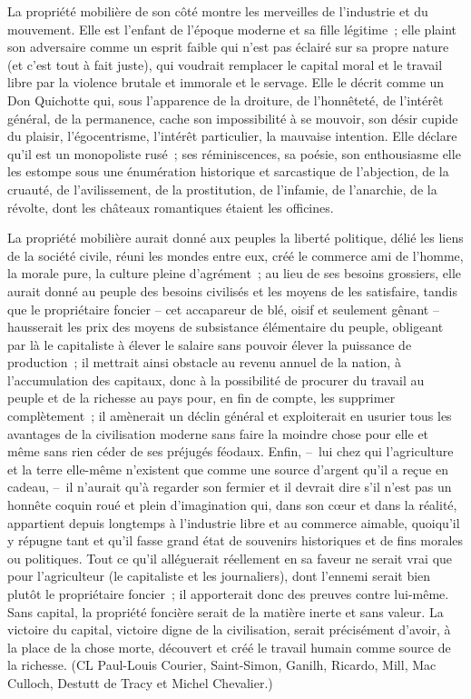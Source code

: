 \documentclass[french,twoside]{book} %
\begin{document}
La propriété mobilière de son côté montre les merveilles de l’industrie et du mouvement. Elle est l’enfant de l’époque moderne et sa fille légitime ; elle plaint son adversaire comme un esprit faible qui n’est pas éclairé sur sa propre nature (et c’est tout à fait juste), qui voudrait remplacer le capital moral et le travail libre par la violence brutale et immorale et le servage. Elle le décrit comme un Don Quichotte qui, sous l’apparence de la droiture, de l’honnêteté, de l’intérêt général, de la permanence, cache son impossibilité à se mouvoir, son désir cupide du plaisir, l’égocentrisme, l’intérêt particulier, la mauvaise intention. Elle déclare qu’il est un monopoliste rusé ; ses réminiscences, sa poésie, son enthousiasme elle les estompe sous une énumération historique et sarcastique de l’abjection, de la cruauté, de l’avilissement, de la prostitution, de l’infamie, de l’anarchie, de la révolte, dont les châteaux romantiques étaient les officines.\par
[XLIII] La propriété mobilière aurait donné aux peuples la liberté politique, délié les liens de la société civile, réuni les mondes entre eux, créé le commerce ami de l’homme, la morale pure, la culture pleine d’agrément ; au lieu de ses besoins grossiers, elle aurait donné au peuple des besoins civilisés et les moyens de les satisfaire, tandis que le propriétaire foncier – cet accapareur de blé, oisif et seulement gênant – hausserait les prix des moyens de subsistance élémentaire du peuple, obligeant par là le capitaliste à élever le salaire sans pouvoir élever la puissance de production ; il mettrait ainsi obstacle au revenu annuel de la nation, à l’accumulation des capitaux, donc à la possibilité de procurer du travail au peuple et de la richesse au pays pour, en fin de compte, les supprimer complètement ; il amènerait un déclin général et exploiterait en usurier tous les avantages de la civilisation moderne sans faire la moindre chose pour elle et même sans rien céder de ses préjugés féodaux. Enfin, – lui chez qui l’agriculture et la terre elle-même n’existent que comme une source d’argent qu’il a reçue en cadeau, – il n’aurait qu’à regarder son fermier et il devrait dire s’il n’est pas un honnête coquin roué et plein d’imagination qui, dans son cœur et dans la réalité, appartient depuis longtemps à l’industrie libre et au commerce aimable, quoiqu’il y répugne tant et qu’il fasse grand état de souvenirs historiques et de fins morales ou politiques. Tout ce qu’il alléguerait réellement en sa faveur ne serait vrai que pour l’agriculteur (le capitaliste et les journaliers), dont l’ennemi serait bien plutôt le propriétaire foncier ; il apporterait donc des preuves contre lui-même. Sans capital, la propriété foncière serait de la matière inerte et sans valeur. La victoire du capital, victoire digne de la civilisation, serait précisément d’avoir, à la place de la chose morte, découvert et créé le travail humain comme source de la richesse. (CL Paul-Louis Courier, Saint-Simon, Ganilh, Ricardo, Mill, Mac Culloch, Destutt de Tracy et Michel Chevalier.)\par
\end{document}
